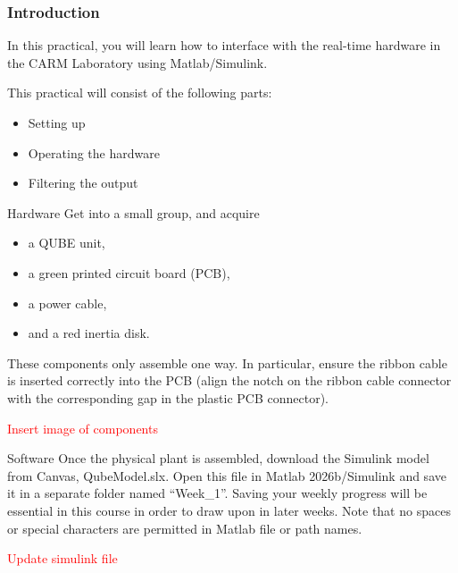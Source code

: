 \documentclass[9pt]{beamer-control}
\begin{document}

\begin{frame}
\frametitle{Introduction}
In this practical, you will learn how to interface with the real-time hardware in the CARM Laboratory using Matlab/Simulink.

\vfill

This practical will consist of the following parts:
\begin{itemize}
\item Setting up
\item Operating the hardware
\item Filtering the output
\end{itemize}
\end{frame}


\begin{frame}{Hardware}
Get into a small group, and acquire 
\begin{itemize}
	\item a QUBE unit,
	\item a green printed circuit board (PCB),
	\item a power cable,
	\item and a red inertia disk.
\end{itemize}  

These components only assemble one way. In particular, ensure the ribbon cable is inserted correctly into the PCB (align the notch on the ribbon cable connector with the corresponding gap in the plastic PCB connector).

\textcolor{red}{Insert image of components}


\end{frame}


\begin{frame}{Software}
Once the physical plant is assembled, download the Simulink model from Canvas, QubeModel.slx. Open this file in Matlab 2026b/Simulink and save it in a separate folder named “Week\_1”. Saving your weekly progress will be essential in this course in order to draw upon in later weeks. Note that no spaces or special characters are permitted in Matlab file or path names.

\textcolor{red}{Update simulink file}
\end{frame}



\end{document}
